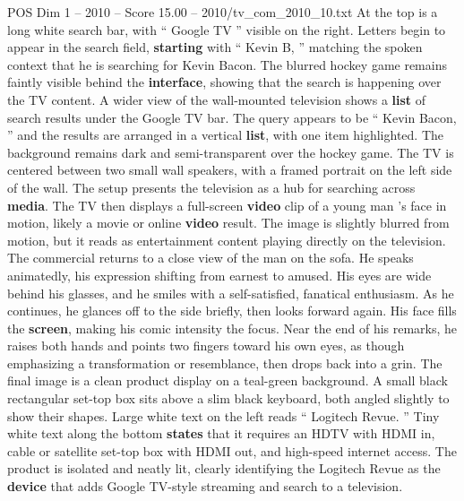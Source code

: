 \begin{textsample}{POS Dim 1 – 2010 – Score 15.00 – 2010/tv\_com\_2010\_10.txt}
At the top is a long white search bar, with “ Google TV ” visible on the right.
Letters begin to appear in the search field, \textbf{starting} with “ Kevin B, ” matching the spoken context that he is searching for Kevin Bacon.
The blurred hockey game remains faintly visible behind the \textbf{interface}, showing that the search is happening over the TV content.
A wider view of the wall-mounted television shows a \textbf{list} of search results under the Google TV bar.
The query appears to be “ Kevin Bacon, ” and the results are arranged in a vertical \textbf{list}, with one item highlighted.
The background remains dark and semi-transparent over the hockey game.
The TV is centered between two small wall speakers, with a framed portrait on the left side of the wall.
The setup presents the television as a hub for searching across \textbf{media}.
The TV then displays a full-screen \textbf{video} clip of a young man ’s face in motion, likely a movie or online \textbf{video} result.
The image is slightly blurred from motion, but it reads as entertainment content playing directly on the television.
The commercial returns to a close view of the man on the sofa.
He speaks animatedly, his expression shifting from earnest to amused.
His eyes are wide behind his glasses, and he smiles with a self-satisfied, fanatical enthusiasm.
As he continues, he glances off to the side briefly, then looks forward again.
His face fills the \textbf{screen}, making his comic intensity the focus.
Near the end of his remarks, he raises both hands and points two fingers toward his own eyes, as though emphasizing a transformation or resemblance, then drops back into a grin.
The final image is a clean product display on a teal-green background.
A small black rectangular set-top box sits above a slim black keyboard, both angled slightly to show their shapes.
Large white text on the left reads “ Logitech Revue. ” Tiny white text along the bottom \textbf{states} that it requires an HDTV with HDMI in, cable or satellite set-top box with HDMI out, and high-speed internet access.
The product is isolated and neatly lit, clearly identifying the Logitech Revue as the \textbf{device} that adds Google TV-style streaming and search to a television.

\end{textsample}
